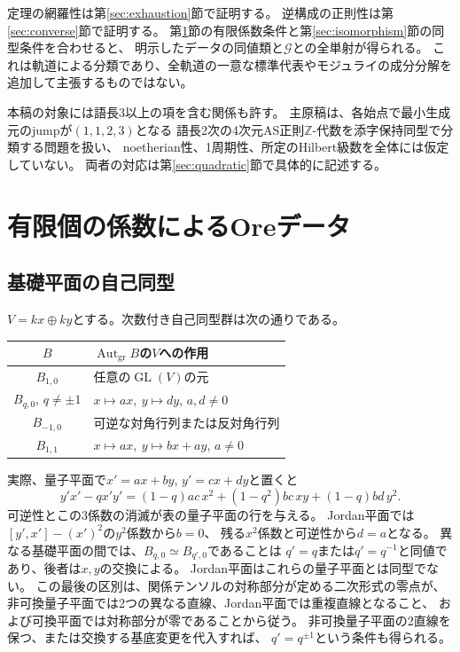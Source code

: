 \documentclass[11pt,a4paper]{ltjsarticle}
\theoremstyle{definition}
\newcommand{\Aut}{\operatorname{Aut}}
\newcommand{\GL}{\operatorname{GL}}
\newcommand{\ZZ}{\mathbb Z}
\newcommand{\Gclass}{\mathcal G}
\begin{document}
定理の網羅性は第\ref{sec:exhaustion}節で証明する。
逆構成の正則性は第\ref{sec:converse}節で証明する。
第\ref{sec:data}節の有限係数条件と第\ref{sec:isomorphism}節の同型条件を合わせると、
明示したデータの同値類と$\Gclass$との全単射が得られる。
これは軌道による分類であり、全軌道の一意な標準代表やモジュライの成分分解を
追加して主張するものではない。

本稿の対象には語長3以上の項を含む関係も許す。
主原稿は、各始点で最小生成元のjumpが$(1,1,2,3)$となる
語長2次の4次元AS正則$\ZZ$-代数を添字保持同型で分類する問題を扱い、
noetherian性、1周期性、所定のHilbert級数を全体には仮定していない。
両者の対応は第\ref{sec:quadratic}節で具体的に記述する。

\section{有限個の係数によるOreデータ}\label{sec:data}
\subsection{基礎平面の自己同型}
$V=kx\oplus ky$とする。次数付き自己同型群は次の通りである。
\begin{center}
\begin{tabular}{c|p{.65\linewidth}}
\toprule
$B$ & $\Aut_{\mathrm{gr}}B$の$V$への作用\\
\midrule
$B_{1,0}$ & 任意の$\GL(V)$の元\\
$B_{q,0}$, $q\ne\pm1$ & $x\mapsto ax,\ y\mapsto dy$, $a,d\ne0$\\
$B_{-1,0}$ & 可逆な対角行列または反対角行列\\
$B_{1,1}$ & $x\mapsto ax,\ y\mapsto bx+ay$, $a\ne0$\\
\bottomrule
\end{tabular}
\end{center}
実際、量子平面で$x'=ax+by$, $y'=cx+dy$と置くと
\[
y'x'-qx'y'=(1-q)ac\,x^2+(1-q^2)bc\,xy+(1-q)bd\,y^2.
\]
可逆性とこの3係数の消滅が表の量子平面の行を与える。
Jordan平面では$[y',x']-(x')^2$の$y^2$係数から$b=0$、
残る$x^2$係数と可逆性から$d=a$となる。
異なる基礎平面の間では、$B_{q,0}\simeq B_{q',0}$であることは
$q'=q$または$q'=q^{-1}$と同値であり、後者は$x,y$の交換による。
Jordan平面はこれらの量子平面とは同型でない。
この最後の区別は、関係テンソルの対称部分が定める二次形式の零点が、
非可換量子平面では2つの異なる直線、Jordan平面では重複直線となること、
および可換平面では対称部分が零であることから従う。
非可換量子平面の2直線を保つ、または交換する基底変更を代入すれば、
$q'=q^{\pm1}$という条件も得られる。
\end{document}
